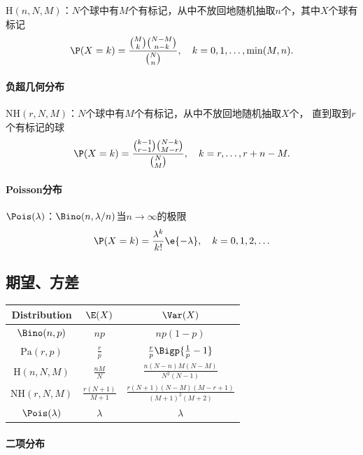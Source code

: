 $\mathrm H(n,N,M)$：$N$个球中有$M$个有标记，从中不放回地随机抽取$n$个，其中$X$个球有标记
\begin{equation}
	\P(X=k)=\frac{\binom Mk\binom{N-M}{n-k}}{\binom N n},\quad k=0,1,\ldots,\min(M,n).
\end{equation}

\paragraph{负超几何分布}

$\mathrm{NH}(r,N,M)$：$N$个球中有$M$个有标记，从中不放回地随机抽取$X$个，
直到取到$r$个有标记的球
\begin{equation}
	\P(X=k)=\frac{\binom{k-1}{r-1}\binom{N-k}{M-r}}{\binom N M},\quad k=r,\ldots,r+n-M.
\end{equation}

\paragraph{Poisson分布}

$\Pois(\lambda)$：$\Bino(n,\lambda/n)$当$n\to\infty$的极限
\begin{equation}
	\P(X=k)=\frac{\lambda^k}{k!}\e{-\lambda},\quad k=0,1,2,\ldots
\end{equation}

\subsection{期望、方差}

\begin{center}
	\begin{tabular}{ccc}
		\toprule
		Distribution&$\E(X)$&$\Var(X)$\\
		\midrule
		$\Bino(n,p)$&$np$&$np(1-p)$\\[1ex]
		$\mathrm{Pa}(r,p)$&$\frac rp$&$\frac rp\Bigp{\frac1p-1}$\\[2ex]
		$\mathrm H(n,N,M)$&$\frac{nM}N$&$\frac{n(N-n)M(N-M)}{N^2(N-1)}$\\[2ex]
		$\mathrm{NH}(r,N,M)$&$\frac{r(N+1)}{M+1}$&$\frac{r(N+1)(N-M)(M-r+1)}{(M+1)^2(M+2)}$\\
		$\Pois(\lambda)$&$\lambda$&$\lambda$\\
		\bottomrule
	\end{tabular}
\end{center}

\paragraph{二项分布}

